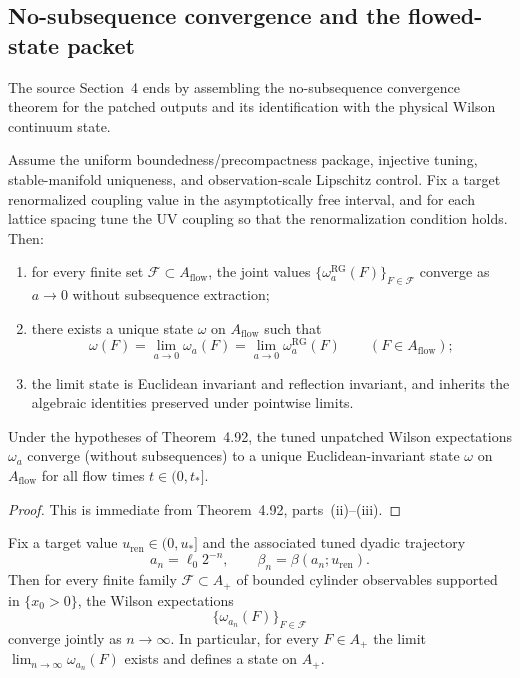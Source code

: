 \documentclass[preprint,aip,jmp,amsmath,amssymb,nofootinbib]{revtex4-2}
\begin{document}
\subsection{No-subsequence convergence and the flowed-state packet}
The source Section~4 ends by assembling the no-subsequence convergence theorem for the patched outputs and its identification with the physical Wilson continuum state.

\begin{theorem}
Assume the uniform boundedness/precompactness package, injective tuning, stable-manifold uniqueness, and observation-scale Lipschitz control. Fix a target renormalized coupling value in the asymptotically free interval, and for each lattice spacing tune the UV coupling so that the renormalization condition holds. Then:
\begin{enumerate}
\item for every finite set $\mathcal F\subset A_{\mathrm{flow}}$, the joint values $\{\omega_a^{\mathrm{RG}}(F)\}_{F\in\mathcal F}$ converge as $a\to 0$ without subsequence extraction;
\item there exists a unique state $\omega$ on $A_{\mathrm{flow}}$ such that
\[
\omega(F)=\lim_{a\to 0}\omega_a(F)=\lim_{a\to 0}\omega_a^{\mathrm{RG}}(F)
\qquad (F\in A_{\mathrm{flow}});
\]
\item the limit state is Euclidean invariant and reflection invariant, and inherits the algebraic identities preserved under pointwise limits.
\end{enumerate}
\end{theorem}

\begin{corollary}
Under the hypotheses of Theorem~4.92, the tuned unpatched Wilson expectations $\omega_a$ converge (without subsequences) to a unique Euclidean-invariant state $\omega$ on $A_{\mathrm{flow}}$ for all flow times $t\in(0,t_\ast]$.
\end{corollary}

\begin{proof}
This is immediate from Theorem~4.92, parts~(ii)--(iii).
\end{proof}

\begin{corollary}
Fix a target value $u_{\mathrm{ren}}\in (0,u_\ast]$ and the associated tuned dyadic trajectory
\[
a_n=\ell_0 2^{-n},
\qquad
\beta_n = \beta(a_n;u_{\mathrm{ren}}).
\]
Then for every finite family $\mathcal F\subset A_+$ of bounded cylinder observables supported in $\{x_0>0\}$, the Wilson expectations
\[
\{\omega_{a_n}(F)\}_{F\in\mathcal F}
\]
converge jointly as $n\to\infty$. In particular, for every $F\in A_+$ the limit $\lim_{n\to\infty}\omega_{a_n}(F)$ exists and defines a state on $A_+$.
\end{corollary}
\end{document}

